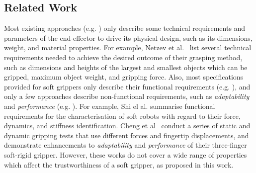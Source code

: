 \documentclass[letterpaper, 10 pt, conference]{ieeeconf}  %
\begin{document}
	\subsection{Related Work}\label{relatedwork}
	Most existing approaches (e.g. \cite{Netzev2023,Hong2022,Bhattacharya2019,Tadakuma2020,Loh2014,Nishikawa2019,Mohan2020}) only describe some technical requirements and parameters of the end-effector to drive its physical design, such as its dimensions, weight, and material properties. For example, Netzev et al.~\cite{Netzev2023} list several technical requirements needed to achieve the desired outcome of their grasping method, such as dimensions and heights of the largest and smallest objects which can be gripped, maximum object weight, and gripping force. 
	Also, most specifications provided for soft grippers only describe their functional requirements (e.g. \cite{Shi2023}), and only a few approaches describe non-functional requirements, such as \emph{adaptability} and \emph{performance} (e.g. \cite{Cheng2021,Liu2021,Chen2018,Cai2021,Hwang2020,Shin2021}).  
	For example, Shi el al. \cite{Shi2023} summarise functional requirements for the characterisation of soft robots with regard to
	their force, dynamics, and stiffness identification. 
	Cheng et al~\cite{Cheng2021} conduct a series of static and dynamic gripping tests that use different forces and fingertip displacements, and demonstrate enhancements to \emph{adaptability} and \emph{performance} of their three-finger soft-rigid gripper. %
	However, these works do not cover a wide range of properties which affect the trustworthiness of a soft gripper, as proposed in this work.  
	
	
	
\end{document}
